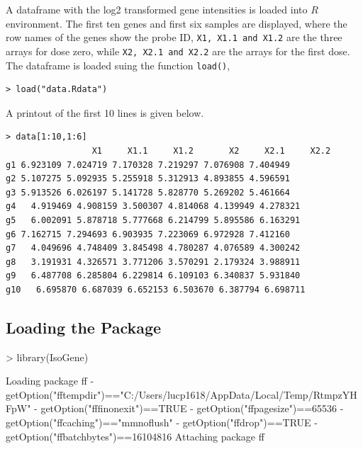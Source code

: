 \documentclass[10pt]{mybook4}
\newenvironment{boxit}{\begin{lrbox}{\savepar}
\begin{minipage}[b]{5.0in}}
{\end{minipage}\end{lrbox}\fbox{\usebox{\savepar}}}
\begin{document}
A dataframe with the log2 transformed gene intensities is loaded
into $R$ environment. The first ten genes and first six samples are
displayed, where the row names of the genes show the probe ID,
\texttt{X1, X1.1 and X1.2} are the three arrays for dose zero, while
\texttt{X2, X2.1 and X2.2} are the arrays for the first dose. The dataframe is loaded suing the function \texttt{load()},
\begin{center}
\begin{boxit}
\begin{verbatim}
> load("data.Rdata")
\end{verbatim}
\end{boxit}
\end{center}
A printout of the first 10 lines is given below.
\begin{center}
\begin{boxit}
\begin{verbatim}
> data[1:10,1:6]
                 X1     X1.1     X1.2       X2     X2.1     X2.2
g1 6.923109 7.024719 7.170328 7.219297 7.076908 7.404949
g2 5.107275 5.092935 5.255918 5.312913 4.893855 4.596591
g3 5.913526 6.026197 5.141728 5.828770 5.269202 5.461664
g4   4.919469 4.908159 3.500307 4.814068 4.139949 4.278321
g5   6.002091 5.878718 5.777668 6.214799 5.895586 6.163291
g6 7.162715 7.294693 6.903935 7.223069 6.972928 7.412160
g7   4.049696 4.748409 3.845498 4.780287 4.076589 4.300242
g8   3.191931 4.326571 3.771206 3.570291 2.179324 3.988911
g9   6.487708 6.285804 6.229814 6.109103 6.340837 5.931840
g10   6.695870 6.687039 6.652153 6.503670 6.387794 6.698711
\end{verbatim}
\end{boxit}
\end{center}

\subsection{Loading the Package}


\begin{Schunk}
\begin{Sinput}
> library(IsoGene)
\end{Sinput}
\begin{Soutput}
Loading package ff
- getOption("fftempdir")=="C:/Users/lucp1618/AppData/Local/Temp/RtmpzYHFpW"
- getOption("fffinonexit")==TRUE
- getOption("ffpagesize")==65536
- getOption("ffcaching")=="mmnoflush"
- getOption("ffdrop")==TRUE
- getOption("ffbatchbytes")==16104816
Attaching package ff
\end{Soutput}
\end{Schunk}
\end{document}
